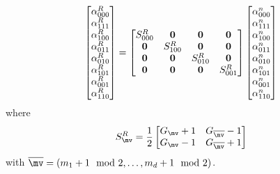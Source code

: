 \documentclass{article}
\begin{document}
\[
  \left[\begin{matrix} \alpha_{000}^{R} \\ \alpha_{111}^{R}  \\ 
                       \alpha_{100}^{R}  \\ \alpha_{011}^{R} \\
                       \alpha_{010}^{R}  \\ \alpha_{101}^{R} \\
                       \alpha_{001}^{R}  \\ \alpha_{110}^{R}  \end{matrix}\right] 
 = 
  \left[\begin{matrix} S^R_{000} & {\mathbf 0} & {\mathbf 0} &  {\mathbf 0} \\
                        {\mathbf 0} & S^R_{100} & {\mathbf 0} & {\mathbf 0} \\
                        {\mathbf 0} & {\mathbf 0} & S^R_{010} & {\mathbf 0}  \\
                        {\mathbf 0} & {\mathbf 0} & {\mathbf 0} & S^R_{001}  \\
          \end{matrix}\right]
  \left[\begin{matrix} \alpha_{000}^{n} \\ \alpha_{111}^{n}  \\ 
                       \alpha_{100}^{n}  \\ \alpha_{011}^{n} \\
                       \alpha_{010}^{n}  \\ \alpha_{101}^{n} \\
                       \alpha_{001}^{n}  \\ \alpha_{110}^{n}  \end{matrix}\right] 
\]
where
\newcommand{\mvb}{{\overline{\mv}}}
\[ 
 S^R_\mv = {1\over 2}
   \left[\begin{matrix}
         G_\mv +1 &  G_{\mvb} -1 \\
         G_\mv -1 &  G_{\mvb} +1 \\
   \end{matrix}\right]
\]
with $\mvb = (m_1+1\mod2,\ldots,m_d+1\mod2)$.
\end{document}
